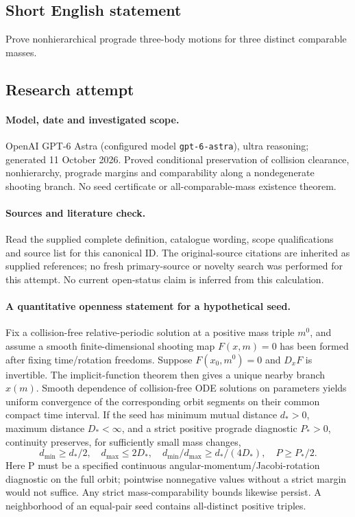 \documentclass[11pt]{article}
\begin{document}
\subsection{Short English statement}
Prove nonhierarchical prograde three-body motions for three distinct comparable masses.
\subsection{Research attempt}
\paragraph{Model, date and investigated scope.}
OpenAI GPT-6 Astra (configured model \texttt{gpt-6-astra}), ultra reasoning; generated 11 October 2026. Proved conditional preservation of collision clearance, nonhierarchy, prograde margins and comparability along a nondegenerate shooting branch. No seed certificate or all-comparable-mass existence theorem.

\paragraph{Sources and literature check.}
Read the supplied complete definition, catalogue wording, scope qualifications and source list for this canonical ID. The original-source citations are inherited as supplied references; no fresh primary-source or novelty search was performed for this attempt. No current open-status claim is inferred from this calculation.

\paragraph{A quantitative openness statement for a hypothetical seed.}Fix a collision-free relative-periodic solution at a positive mass triple \(m^0\), and assume a smooth finite-dimensional shooting map \(F(x,m)=0\) has been formed after fixing time/rotation freedoms. Suppose \(F(x_0,m^0)=0\) and \(D_xF\) is invertible. The implicit-function theorem then gives a unique nearby branch \(x(m)\). Smooth dependence of collision-free ODE solutions on parameters yields uniform convergence of the corresponding orbit segments on their common compact time interval.
If the seed has minimum mutual distance \(d_*>0\), maximum distance \(D_*<\infty\), and a strict positive prograde diagnostic \(P_*>0\), continuity preserves, for sufficiently small mass changes,
\[d_{\min}\ge d_*/2,\quad d_{\max}\le2D_*,\quad d_{\min}/d_{\max}\ge d_*/(4D_*),\quad P\ge P_*/2.
\]
Here P must be a specified continuous angular-momentum/Jacobi-rotation diagnostic on the full orbit; pointwise nonnegative values without a strict margin would not suffice. Any strict mass-comparability bounds likewise persist. A neighborhood of an equal-pair seed contains all-distinct positive triples.
\end{document}

